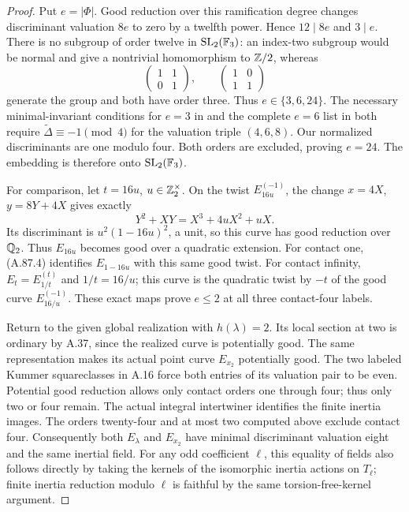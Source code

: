 \begin{proof}
Put $e=|\Phi|$.  Good reduction over this ramification
degree changes discriminant valuation $8e$ to zero by a
twelfth power.  Hence $12\mid8e$ and $3\mid e$.
There is no subgroup of order twelve in
$\mathrm{SL}_2(\mathbb F_3)$: an index-two subgroup would be normal
and give a nontrivial homomorphism to $\mathbb Z/2$, whereas
\[
 \begin{pmatrix}1&1\\0&1\end{pmatrix},\qquad
 \begin{pmatrix}1&0\\1&1\end{pmatrix}
\tag{A.87.7}
\]
generate the group and both have order three.
Thus $e\in\{3,6,24\}$.
The necessary minimal-invariant conditions for $e=3$ in
\cite[Table~5, case $C_{3,\mathrm{iii}}$]{LegFreitasKraus2022}
and the complete $e=6$ list in
\cite[\S14.3]{LegFreitasKraus2022} both require
$\widetilde\Delta\equiv-1\pmod4$ for the valuation triple
$(4,6,8)$.  Our normalized discriminants are one modulo
four.  Both orders are excluded, proving $e=24$.
The embedding is therefore onto
$\mathrm{SL}_2(\mathbb F_3)$.

For comparison, let $t=16u$, $u\in\mathbb Z_2^\times$.
On the twist $E_{16u}^{(-1)}$, the change
$x=4X$, $y=8Y+4X$ gives exactly
\[
               Y^2+XY=X^3+4uX^2+uX.
\tag{A.87.8}
\]
Its discriminant is $u^2(1-16u)^2$, a unit, so this
curve has good reduction over $\mathbb Q_2$.
Thus $E_{16u}$ becomes good over a quadratic extension.
For contact one, (A.87.4) identifies $E_{1-16u}$ with
this same good twist.  For contact infinity,
$E_t=E_{1/t}^{(t)}$ and $1/t=16/u$; this curve is the
quadratic twist by $-t$ of the good curve
$E_{16/u}^{(-1)}$.
These exact maps prove $e\le2$ at all three contact-four
labels.

Return to the given global realization with
$h(\lambda)=2$.  Its local section at two is ordinary
by A.37, since the realized curve is potentially good.
The same representation makes its actual point curve
$E_{x_2}$ potentially good.
The two labeled Kummer squareclasses in A.16 force both
entries of its valuation pair to be even.
Potential good reduction allows only contact orders
one through four; thus only two or four remain.
The actual integral intertwiner identifies the finite
inertia images.  The orders twenty-four and at most two
computed above exclude contact four.
Consequently both $E_{\lambda}$ and $E_{x_2}$ have
minimal discriminant valuation eight and the same
inertial field.
For any odd coefficient $\ell$, this equality of fields
also follows directly by taking the kernels of the
isomorphic inertia actions on $T_\ell$; finite inertia
reduction modulo $\ell$ is faithful by the same
torsion-free-kernel argument.


\end{proof}
